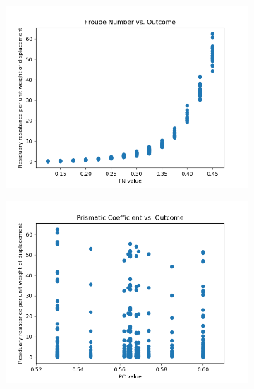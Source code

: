 \documentclass[11pt,a4paper]{article}
\begin{document}
\begin{figure}[ht]
	\centering
	\begin{subfigure}[h]{0.4\textwidth}
		\includegraphics[width=\textwidth]{fn}
		\caption{ }
		\label{fig:fn}
	\end{subfigure}
	\par\bigskip
	\begin{subfigure}[h]{0.4\textwidth}
		\includegraphics[width=\textwidth]{pc}
		\caption{ }
		\label{fig:pc}
	\end{subfigure}
	\par\bigskip
	\begin{subfigure}[h]{0.4\textwidth}

\end{subfigure}
\end{figure}
\end{document}
